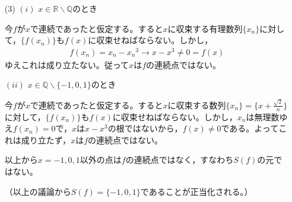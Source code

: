 \documentclass[a4paper,12pt,dvipdfmx,fleqn, oneside]{jsarticle}
\theoremstyle{defstyle}
\theoremstyle{thmx}
\theoremstyle{qesstyle}
\begin{document}
\begin{screen}
    \begin{enumerate}
        \item[(3)] $(i)$ $x \in \mathbb{R}\backslash \mathbb{Q}$のとき

            今$f$が$x$で連続であったと仮定する。すると$x$に収束する有理数列$\{x_n\}$に対して，$\{f(x_n)\}$も$f(x)$に収束せねばならない。しかし，
            \begin{align*}
                f(x_n) = x_n- {x_n}^3 \to x - x^3 \neq 0 = f(x)
            \end{align*}
            ゆえこれは成り立たない。従って$x$は$f$の連続点ではない。

            $(ii)$ $x \in \mathbb{Q} \backslash \{-1,0,1\}$のとき

            今$f$が$x$で連続であったと仮定する。すると$x$に収束する数列$\{x_n\}=\Big\{x + \frac{\sqrt{2}}{n}\Big\}$に対して，$\{f(x_n)\}$も$f(x)$に収束せねばならない。しかし，$x_n$は無理数ゆえ$f(x_n)=0$で，$x$は$x-x^3$の根ではないから，$f(x)\neq 0 $である。よってこれは成り立たず，$x$は$f$の連続点ではない。

            以上から$x=-1,0,1$以外の点は$f$の連続点ではなく，すなわち$S(f)$の元ではない。

            （以上の議論から$S(f)=\{-1,0,1\}$であることが正当化される。）
    \end{enumerate}
\end{screen}
\end{document}
